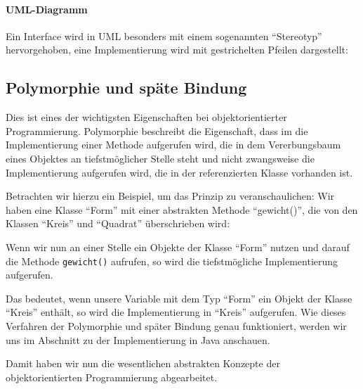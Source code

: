 	\paragraph{UML-Diagramm}
		Ein Interface wird in UML besonders mit einem sogenannten \enquote{Stereotyp} hervorgehoben, eine Implementierung wird mit gestrichelten Pfeilen dargestellt:
		\begin{figure}[H]
			\centering
		\end{figure}

\subsection{Polymorphie und späte Bindung} \imperativeMark \oopMark

	Dies ist eines der wichtigsten Eigenschaften bei objektorientierter Programmierung. Polymorphie beschreibt die Eigenschaft, dass im die Implementierung einer Methode aufgerufen wird, die in dem Vererbungsbaum eines Objektes an tiefstmöglicher Stelle steht und nicht zwangsweise die Implementierung aufgerufen wird, die in der referenzierten Klasse vorhanden ist.
	
	Betrachten wir hierzu ein Beispiel, um das Prinzip zu veranschaulichen: Wir haben eine Klasse \enquote{Form} mit einer abstrakten Methode \enquote{gewicht()}, die von den Klassen \enquote{Kreis} und \enquote{Quadrat} überschrieben wird:
	\begin{figure}[H]
		\centering
	\end{figure}
	Wenn wir nun an einer Stelle ein Objekte der Klasse \enquote{Form} nutzen und darauf die Methode \texttt{gewicht()} aufrufen, so wird die tiefstmögliche Implementierung aufgerufen.
	
	Das bedeutet, wenn unsere Variable mit dem Typ \enquote{Form} ein Objekt der Klasse \enquote{Kreis} enthält, so wird die Implementierung in \enquote{Kreis} aufgerufen. Wie dieses Verfahren der Polymorphie und später Bindung genau funktioniert, werden wir uns im Abschnitt  zu der Implementierung in Java anschauen.
	
	Damit haben wir nun die wesentlichen abstrakten Konzepte der objektorientierten Programmierung abgearbeitet.
